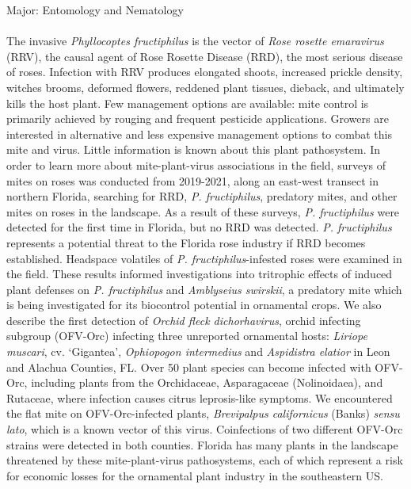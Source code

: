 \documentclass{ufdissertation}[overrideChapters] %
\begin{document}
                            \noindent Major: {Entomology and Nematology} \\
   \hphantom{forcing a space here} \\
{The invasive \emph{Phyllocoptes fructiphilus} is the vector of \emph{Rose rosette emaravirus} (RRV), the causal agent of Rose Rosette Disease (RRD), the most serious disease of roses. Infection with RRV produces elongated shoots, increased prickle density, witches brooms, deformed flowers, reddened plant tissues, dieback, and ultimately kills the host plant. Few management options are available: mite control is primarily achieved by rouging and frequent pesticide applications. Growers are interested in alternative and less expensive management options to combat this mite and virus. Little information is known about this plant pathosystem. In order to learn more about mite-plant-virus associations in the field, surveys of mites on roses was conducted from 2019-2021, along an east-west transect in northern Florida, searching for RRD, \emph{P. fructiphilus}, predatory mites, and other mites on roses in the landscape. As a result of these surveys, \emph{P. fructiphilus} were detected for the first time in Florida, but no RRD was detected. \emph{P. fructiphilus} represents a potential threat to the Florida rose industry if RRD becomes established. Headspace volatiles of \emph{P. fructiphilus}-infested roses were examined in the field. These results informed investigations into tritrophic effects of induced plant defenses on \emph{P. fructiphilus} and \emph{Amblyseius swirskii}, a predatory mite which is being investigated for its biocontrol potential in ornamental crops. We also describe the first detection of \emph{Orchid fleck dichorhavirus}, orchid infecting subgroup (OFV-Orc) infecting three unreported ornamental hosts: \emph{Liriope muscari}, cv. `Gigantea', \emph{Ophiopogon intermedius} and \emph{Aspidistra elatior} in Leon and Alachua Counties, FL. Over 50 plant species can become infected with OFV-Orc, including plants from the Orchidaceae, Asparagaceae (Nolinoidaea), and Rutaceae, where infection causes citrus leprosis-like symptoms. We encountered the flat mite on OFV-Orc-infected plants, \emph{Brevipalpus californicus} (Banks) \emph{sensu lato}, which is a known vector of this virus. Coinfections of two different OFV-Orc strains were detected in both counties. Florida has many plants in the landscape threatened by these mite-plant-virus pathosystems, each of which represent a risk for economic losses for the ornamental plant industry in the southeastern US.}
\end{document}
